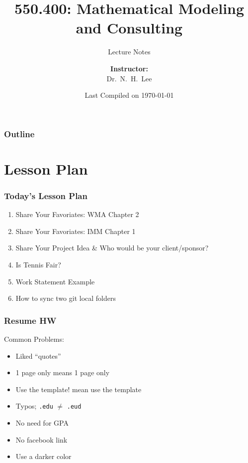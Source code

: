 \documentclass[hyperref={colorlinks=false},handout,10pt]{beamer}
\title{{\color{blue} \LARGE 550.400: Mathematical Modeling and Consulting\newline} }
\subtitle{{\color{red} \large Lecture Notes} }
\author{ 
    {\bf{Instructor:}} \\ 
Dr.~N.~H.~Lee \\ 
    \vspace{5pt}
}
\institute{JHU AMS 2012 FALL}
\date{\mygreen Last Compiled on \today}
\let\olditem\item
\renewcommand{\item}{\setlength{\itemsep}{0.5\baselineskip}\olditem}
\begin{document}
\begin{frame}[plain]
  \titlepage
\end{frame}

\begin{frame}
  \frametitle{Outline}
  \tableofcontents
\end{frame}

\section{Lesson Plan}
\begin{frame}%
    \frametitle{Today's Lesson Plan}
    \begin{enumerate}
        \item Share Your Favoriates: WMA Chapter 2
        \item Share Your Favoriates: IMM Chapter 1
        \item Share Your Project Idea \& Who would be your client/sponsor?
        \item Is Tennis Fair?
        \item Work Statement Example
        \item How to sync two git local folders
    \end{enumerate} 
\end{frame}

\begin{frame}
    \frametitle{Resume HW}
    Common Problems:
    \begin{itemize}
        \item Liked ``quotes''
        \item 1 page only means 1 page only
        \item Use the template! mean use the template
        \item Typos; \texttt{.edu} $\neq$ \texttt{.eud}
        \item No need for GPA 
        \item No facebook link
        \item Use a darker color
    \end{itemize}
\end{frame}










\end{document}
